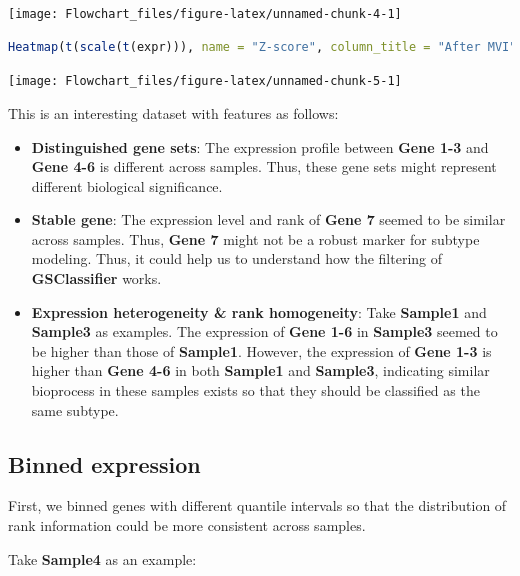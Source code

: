 \documentclass[
  12pt,
]{book}
\begin{document}
\begin{center}\texttt{[image: Flowchart\_files/figure-latex/unnamed-chunk-4-1]} \end{center}

\begin{lstlisting}[language=R]
Heatmap(t(scale(t(expr))), name = "Z-score", column_title = "After MVI")
\end{lstlisting}

\begin{center}\texttt{[image: Flowchart\_files/figure-latex/unnamed-chunk-5-1]} \end{center}

This is an interesting dataset with features as follows:

\begin{itemize}
\item
  \textbf{Distinguished gene sets}: The expression profile between \textbf{Gene 1-3} and \textbf{Gene 4-6} is different across samples. Thus, these gene sets might represent different biological significance.
\item
  \textbf{Stable gene}: The expression level and rank of \textbf{Gene 7} seemed to be similar across samples. Thus, \textbf{Gene 7} might not be a robust marker for subtype modeling. Thus, it could help us to understand how the filtering of \textbf{GSClassifier} works.
\item
  \textbf{Expression heterogeneity \& rank homogeneity}: Take \textbf{Sample1} and \textbf{Sample3} as examples. The expression of \textbf{Gene 1-6} in \textbf{Sample3} seemed to be higher than those of \textbf{Sample1}. However, the expression of \textbf{Gene 1-3} is higher than \textbf{Gene 4-6} in both \textbf{Sample1} and \textbf{Sample3}, indicating similar bioprocess in these samples exists so that they should be classified as the same subtype.
\end{itemize}

\hypertarget{binned-expression}{%
\subsection{Binned expression}\label{binned-expression}}

First, we binned genes with different quantile intervals so that the distribution of rank information could be more consistent across samples.

Take \textbf{Sample4} as an example:
\end{document}
